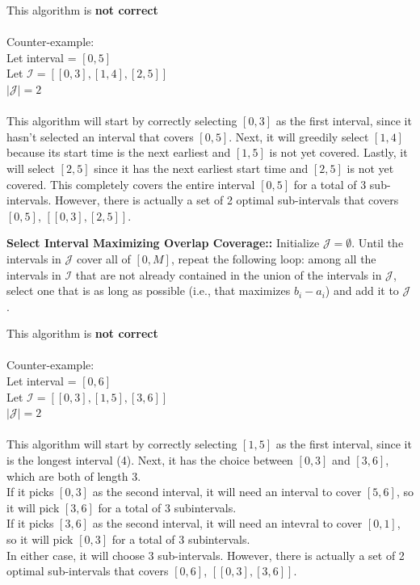 \documentclass{hw_template}
\begin{document}
\begin{problem}
\begin{solution}
This algorithm is \textbf{not correct}\\\\
Counter-example:\\
Let interval = $[0,5]$\\
Let $\mathcal{I} = [[0,3], [1,4], [2,5]]$\\
$|\mathcal{J}| = 2$\\\\
This algorithm will start by correctly selecting $[0,3]$ as the first interval, 
since it hasn't selected an interval that covers $[0,5]$. Next, it will greedily
select $[1,4]$ because its start time is the next earliest and $[1,5]$ is not yet covered. 
Lastly, it will select $[2,5]$ since it has the next earliest start time and 
$[2,5]$ is not yet covered. This completely covers the entire interval $[0,5]$
for a total of 3 sub-intervals. However, there is actually a set of 2 optimal sub-intervals 
that covers $[0,5]$, $[[0,3], [2,5]]$.
\end{solution}

  \begin{subproblem}
    \textbf{Select Interval Maximizing Overlap Coverage::}
  Initialize $\mathcal{J}=\emptyset$.
  Until the intervals in $\mathcal{J}$ cover all of $[0,M]$,
  repeat the following loop: among all the intervals in
  $\mathcal{I}$ that are not already contained in the union
  of the intervals in $\mathcal{J}$, select one that is as
  long as possible (i.e., that maximizes $b_i-a_i$) and
  add it to $\mathcal{J}$.
  \end{subproblem}

\begin{solution}
This algorithm is \textbf{not correct}\\\\
Counter-example:\\
Let interval = $[0,6]$\\
Let $\mathcal{I} = [[0,3], [1,5], [3,6]]$\\
$|\mathcal{J}| = 2$\\\\
This algorithm will start by correctly selecting $[1,5]$ as the first interval, 
since it is the longest interval (4). Next, it has the choice between $[0,3]$ and 
$[3,6]$, which are both of length 3.\\
If it picks $[0,3]$ as the second interval, it will need an interval to cover $[5,6]$, 
so it will pick $[3,6]$ for a total of 3 subintervals.\\
If it picks $[3,6]$ as the second interval, it will need an intevral to cover $[0,1]$, 
so it will pick $[0,3]$ for a total of 3 subintervals.\\
In either case, it will choose 3 sub-intervals. However, there is actually a set of 
2 optimal sub-intervals that covers $[0,6]$, $[[0,3],[3,6]]$.
\end{solution}


\end{problem}
\end{document}
